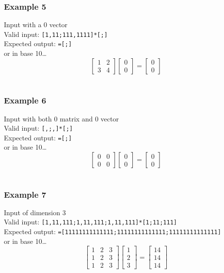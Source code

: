 \documentclass[letterpaper, 11pt]{article}
\begin{document}
\subsubsection{Example 5}
\label{sec:org4d9bea6}
Input with a 0 vector\\
Valid input: \texttt{[1,11;111,1111]*[;]}\\
Expected output: \texttt{=[;]}\\
or in base 10\ldots{}\\
\[\begin{bmatrix}1&2\\3&4\end{bmatrix}\begin{bmatrix}0\\0\end{bmatrix} = \begin{bmatrix}0\\0\end{bmatrix}\]\\
\subsubsection{Example 6}
\label{sec:org599b813}
Input with both 0 matrix and 0 vector\\
Valid input: \texttt{[,;,]*[;]}\\
Expected output: \texttt{=[;]}\\
or in base 10\ldots{}\\
\[\begin{bmatrix}0&0\\0&0\end{bmatrix}\begin{bmatrix}0\\0\end{bmatrix} = \begin{bmatrix}0\\0\end{bmatrix}\]\\
\subsubsection{Example 7}
\label{sec:org865ef19}
Input of dimension 3\\
Valid input: \texttt{[1,11,111;1,11,111;1,11,111]*[1;11;111]}\\
Expected output: \texttt{=[11111111111111;11111111111111;11111111111111]}\\
or in base 10\ldots{}\\
\[\begin{bmatrix}1&2&3\\1&2&3\\1&2&3\end{bmatrix}\begin{bmatrix}1\\2\\3\end{bmatrix} = \begin{bmatrix}14\\14\\14\end{bmatrix}\]\\
\end{document}
